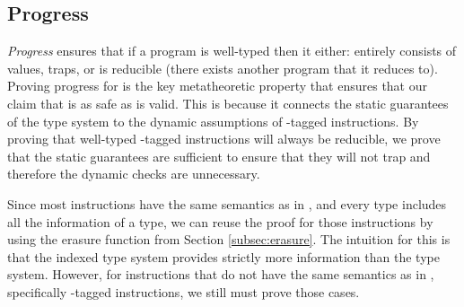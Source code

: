 \subsection{Progress}
\label{subsec:progress}
\emph{Progress} ensures that if a program is well-typed then it either: entirely consists of values, traps, or is reducible (\ie there exists another program that it reduces to).
Proving progress for \name is the key metatheoretic property that ensures that our claim that \name is as safe as \wasm is valid.
This is because it connects the static guarantees of the type system to the dynamic assumptions of \prechk-tagged instructions.
By proving that well-typed \prechk-tagged instructions will always be reducible, we prove that the static guarantees are sufficient to ensure that they will not trap and therefore the dynamic checks are unnecessary.

Since most \name instructions have the same semantics as in \wasm, and every \name type includes all the information of a \wasm type, we can reuse the \wasm proof for those instructions by using the erasure function from Section \ref{subsec:erasure}.
The intuition for this is that the \name indexed type system provides strictly more information than the \wasm type system.
However, for \name instructions that do not have the same semantics as in \wasm, specifically \prechk-tagged instructions, we still must prove those cases.

